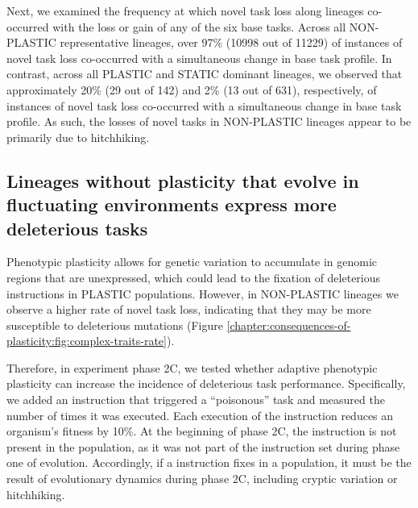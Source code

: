 Next, we examined the frequency at which novel task loss along lineages co-occurred with the loss or gain of any of the six base tasks.
Across all NON-PLASTIC representative lineages, over 97\% (10998 out of 11229) of instances of novel task loss co-occurred with a simultaneous change in base task profile.
In contrast, across all PLASTIC and STATIC dominant lineages, we observed that approximately 20\% (29 out of 142) and 2\% (13 out of 631), respectively, of instances of novel task loss co-occurred with a simultaneous change in base task profile.
As such, the losses of novel tasks in NON-PLASTIC lineages appear to be primarily due to hitchhiking.

\begin{raggedright}
\subsection{Lineages without plasticity that evolve in fluctuating environments express more deleterious tasks}
\end{raggedright}


Phenotypic plasticity allows for genetic variation to accumulate in genomic regions that are unexpressed, which could lead to the fixation of deleterious instructions in PLASTIC populations.
However, in NON-PLASTIC lineages we observe a higher rate of novel task loss, indicating that they may be more susceptible to deleterious mutations (Figure \ref{chapter:consequences-of-plasticity:fig:complex-traits-rate}).

Therefore, in experiment phase 2C, we tested whether adaptive phenotypic plasticity can increase the incidence of deleterious task performance. 
Specifically, we added an instruction that triggered a ``poisonous'' task and measured the number of times it was executed.
Each execution of the   instruction reduces an organism's fitness by 10\%. 
At the beginning of phase 2C, the  instruction is not present in the population, as it was not part of the instruction set during phase one of evolution.
Accordingly, if a  instruction fixes in a population, it must be the result of evolutionary dynamics during phase 2C, including cryptic variation or hitchhiking. 

